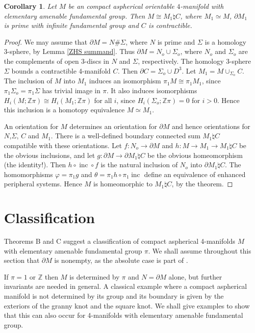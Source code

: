 \documentclass[12pt]{amsart}
\newtheorem{corollary}[theorem]{Corollary}
\theoremstyle{definition}
\newcommand{\Z}{\mathbb Z}
\DeclareMathOperator{\inc}{inc}
\begin{document}
\begin{corollary}
\label{prime bdry}
Let $M$ be an compact aspherical orientable $4$-manifold with 
elementary amenable fundamental group.
Then $M\cong{M_1\natural{C}}$,
where $M_1\simeq{M}$,
$\partial{M}_1$ is prime with infinite fundamental group and $C$ is contractible.
\end{corollary}

\begin{proof}
We may assume that $\partial{M}=N\#\Sigma$, 
where $N$ is prime and $\Sigma$ is a homology 3-sphere, 
by Lemma \ref{ZHS summand}.
Thus $\partial{M}=N_o\cup\Sigma_o$, 
where $N_o$ and $\Sigma_o$ are the complements of open 3-discs in 
$N$ and $\Sigma$, respectively.
The homology 3-sphere $\Sigma$ bounds a contractible 4-manifold $C$.
Then $\partial{C}=\Sigma_o\cup{D^3}$.
Let $M_1=M\cup_{\Sigma_o}C$. 
The inclusion of $M$ into $M_1$ induces an isomorphism $\pi_1M\cong\pi_1M_1$,
since $\pi_1\Sigma_o=\pi_1\Sigma$ has trivial image in $\pi$.
It also induces isomorphisms $H_i(M;\Z\pi)\cong H_i(M_1;\Z\pi)$ for all $i$,
since $H_i(\Sigma_o;\Z\pi)=0$ for $i>0$.
Hence this inclusion is a homotopy equivalence $M\simeq{M_1}$.

An orientation for $M$ determines an orientation for $\partial{M}$
and hence orientations for $N$,$\Sigma$, $C$ and $M_1$.
There is a well-defined boundary connected sum $M_1\natural{C}$
compatible with these orientations.
Let $f:N_o\to\partial{M}$  and  $h:M\to{M_1}\to{M_1\natural{C}}$ be the 
obvious inclusions, and let $g:\partial{M}\to\partial{M_1\natural{C}}$ 
be the obvious homeomorphism (the identity!).
Then $h\circ\inc\circ{f}$ is the natural inclusion of $N_o$ into
$\partial{M_1\natural{C}}$.
The homomorphisms $\varphi=\pi_1g$ and $\theta=\pi_1h\circ \pi_1 \inc$ 
define an equivalence of enhanced peripheral systems.
Hence $M$ is homeomorphic to $M_1\natural{C}$, by the theorem.
\end{proof}

\section{Classification} 
Theorems B and C suggest a classification of compact aspherical 4-manifolds $M$
with elementary amenable fundamental group $\pi$.
We shall assume throughout this section that $\partial{M}$ is nonempty, 
as the absolute case is part of  \cite[Theorem 11.5]{FQ}.

If $\pi=1$ or $\Z$ then $M$ is determined by $\pi$ and $N=\partial{M}$ alone, 
but further invariants are needed in general.
A classical example where a compact aspherical manifold is not determined by its group and its boundary is given by the exteriors of the granny knot and the square knot. 
We shall give examples to show that this can also occur for 4-manifolds 
with elementary amenable fundamental group. 
\end{document}
